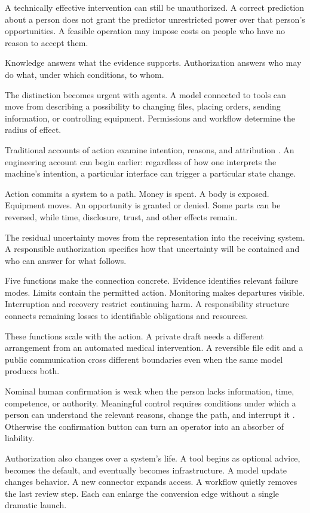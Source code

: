 A technically effective intervention can still be unauthorized. A correct prediction about a person does not grant the predictor unrestricted power over that person's opportunities. A feasible operation may impose costs on people who have no reason to accept them.

Knowledge answers what the evidence supports. Authorization answers who may do what, under which conditions, to whom.

The distinction becomes urgent with agents. A model connected to tools can move from describing a possibility to changing files, placing orders, sending information, or controlling equipment. Permissions and workflow determine the radius of effect.

Traditional accounts of action examine intention, reasons, and attribution \cite{anscombe1957intention,davidson1963actions}. An engineering account can begin earlier: regardless of how one interprets the machine's intention, a particular interface can trigger a particular state change.

Action commits a system to a path. Money is spent. A body is exposed. Equipment moves. An opportunity is granted or denied. Some parts can be reversed, while time, disclosure, trust, and other effects remain.

The residual uncertainty moves from the representation into the receiving system. A responsible authorization specifies how that uncertainty will be contained and who can answer for what follows.

Five functions make the connection concrete. Evidence identifies relevant failure modes. Limits contain the permitted action. Monitoring makes departures visible. Interruption and recovery restrict continuing harm. A responsibility structure connects remaining losses to identifiable obligations and resources.

These functions scale with the action. A private draft needs a different arrangement from an automated medical intervention. A reversible file edit and a public communication cross different boundaries even when the same model produces both.

Nominal human confirmation is weak when the person lacks information, time, competence, or authority. Meaningful control requires conditions under which a person can understand the relevant reasons, change the path, and interrupt it \cite{santoni2018meaningful}. Otherwise the confirmation button can turn an operator into an absorber of liability.

Authorization also changes over a system's life. A tool begins as optional advice, becomes the default, and eventually becomes infrastructure. A model update changes behavior. A new connector expands access. A workflow quietly removes the last review step. Each can enlarge the conversion edge without a single dramatic launch.


